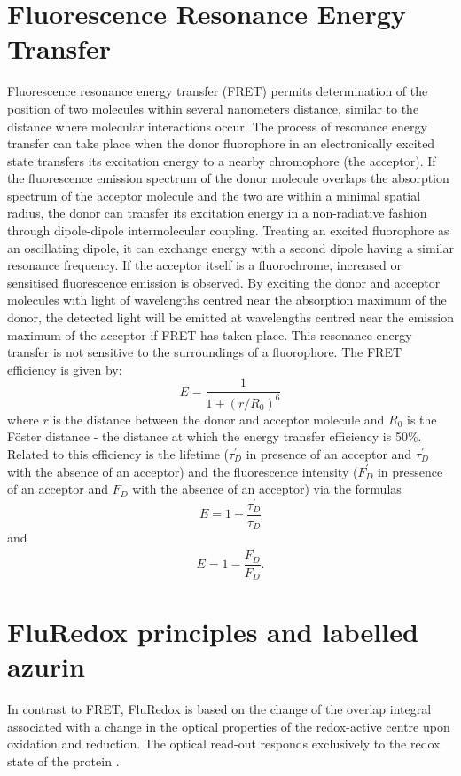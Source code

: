 \documentclass[twoside,single]{lion-msc}
\begin{document}
\section{Fluorescence Resonance Energy Transfer}
Fluorescence resonance energy transfer (FRET) permits determination of the position of two molecules within several nanometers distance, similar to the distance where molecular interactions occur. The process of resonance energy transfer can take place when the donor fluorophore in an electronically excited state transfers its excitation energy to a nearby chromophore (the acceptor). If the fluorescence emission spectrum of the donor molecule overlaps the absorption spectrum of the acceptor molecule and the two are within a minimal spatial radius, the donor can transfer its excitation energy in a non-radiative fashion through dipole-dipole intermolecular coupling. Treating an excited fluorophore as an oscillating dipole, it can exchange energy with a second dipole having a similar resonance frequency. If the acceptor itself is a fluorochrome, increased or sensitised fluorescence emission is observed. By exciting the donor and acceptor molecules with light of wavelengths centred near the absorption maximum of the donor, the detected light will be emitted at wavelengths centred near the emission maximum of the acceptor if FRET has taken place. This resonance energy transfer is not sensitive to the surroundings of a fluorophore. The FRET efficiency is given by:
\begin{equation}
E = \frac{1}{1 + (r/R_{0})^{6}}
\end{equation}
where $r$ is the distance between the donor and acceptor molecule and $R_{0}$ is the F\"oster distance - the distance at which the energy transfer efficiency is 50\%. Related to this efficiency is the lifetime ($\tau_{D}^{'}$ in presence of an acceptor and $\tau_{D}^{'}$ with the absence of an acceptor) and the fluorescence intensity ($F_{D}^{'}$ in pressence of an acceptor and $F_{D}$ with the absence of an acceptor) via the formulas
\begin{equation}
E = 1 - \frac{\tau_{D}^{'}}{\tau_{D}}
\end{equation}
and
\begin{equation}
E = 1 - \frac{F_{D}^{'}}{F_{D}}.
\end{equation}


\section{FluRedox principles and labelled azurin}
In contrast to FRET, FluRedox is based on the change of the overlap integral associated with a change in the optical properties of the redox-active centre upon oxidation and reduction. The optical read-out responds exclusively to the redox state of the protein \cite{Akklc}. 
\end{document}

